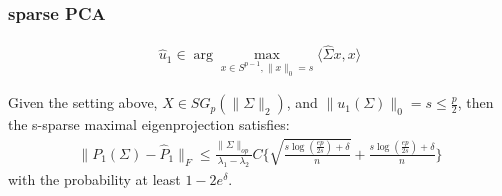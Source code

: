 \subsubsection*{sparse PCA}

\begin{method}
\begin{align*}
	\hat{u}_1 \in  \arg\max_{x \in S^{p-1}, \|x\|_0 = s} \langle \hat{\Sigma}x, x\rangle
\end{align*}
\end{method}

\begin{theorem}
	Given the setting above, $X \in SG_p(\|\Sigma\|_2)$, and $\|u_1(\Sigma)\|_0 = s \le \frac{p}{2}$, then the s-sparse maximal eigenprojection satisfies:
	\begin{align*}
		\|P_1(\Sigma) - \hat{P}_1\|_F \le \frac{\|\Sigma\|_{op}}{\lambda_1 - \lambda_2} C\bigg\{\sqrt{\frac{s\log(\frac{ep}{2s})+ \delta}{n}} + \frac{s\log(\frac{ep}{2s})+\delta}{n}\bigg\}
	\end{align*}
	with the probability at least $1 - 2e^\delta$.
\end{theorem}
